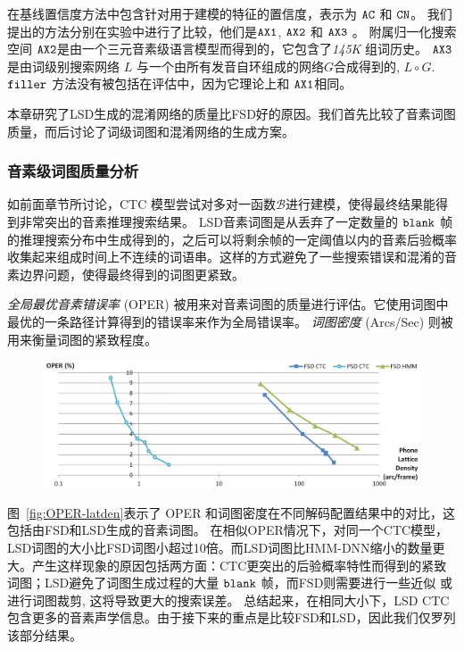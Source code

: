  在基线置信度方法中包含针对用于建模的特征的置信度，表示为 $\tt AC $ 和 $ \tt CN $。 我们提出的方法分别在实验中进行了比较，他们是$\tt AX1 $, $\tt AX2 $ 和 $\tt AX3 $ 。 
 附属归一化搜索空间 $\tt AX2 $是由一个三元音素级语言模型而得到的，它包含了{\em 145K} 组词历史。 $\tt AX3 $ 是由词级别搜索网络 $L$ 与一个由所有发音自环组成的网络$G$合成得到的,  $L \circ G$. $\tt filler$ 方法没有被包括在评估中，因为它理论上和 $\tt AX1$相同。


本章研究了LSD生成的混淆网络的质量比FSD好的原因。我们首先比较了音素词图质量，而后讨论了词级词图和混淆网络的生成方案。


\subsubsection{音素级词图质量分析}
\label{sec:exp-lsd-lat-quality}

如前面章节所讨论，CTC 模型尝试对多对一函数$\mathcal{B}$进行建模，使得最终结果能得到非常突出的音素推理搜索结果。
LSD音素词图是从丢弃了一定数量的 $\tt blank$ 帧的推理搜索分布中生成得到的，之后可以将剩余帧的一定阈值以内的音素后验概率收集起来组成时间上不连续的词语串。这样的方式避免了一些搜索错误和混淆的音素边界问题，使得最终得到的词图更紧致。

{\em 全局最优音素错误率} (OPER) 被用来对音素词图的质量进行评估。它使用词图中最优的一条路径计算得到的错误率来作为全局错误率\cite{hoffmeister2006frame}。 {\em 词图密度} (Arcs/Sec) 则被用来衡量词图的紧致程度\cite{woodland1994large}。


\begin{figure}[!htp]
  \centering
    \captionstyle{\centering}
    \includegraphics[width=\textwidth]{figure/OPER-latden.png}
\end{figure}


图~\ref{fig:OPER-latden}表示了 OPER 和词图密度在不同解码配置结果中的对比，这包括由FSD和LSD生成的音素词图。
在相似OPER情况下，对同一个CTC模型，LSD词图的大小比FSD词图小超过10倍。而LSD词图比HMM-DNN缩小的数量更大。产生这样现象的原因包括两方面：CTC更突出的后验概率特性而得到的紧致词图；LSD避免了词图生成过程的大量 $\tt blank$ 帧，而FSD则需要进行一些近似 \cite{ljolje1999efficient} 或进行词图裁剪\cite{povey2012generating}, 这将导致更大的搜索误差。
总结起来，在相同大小下，LSD CTC包含更多的音素声学信息。由于接下来的重点是比较FSD和LSD，因此我们仅罗列该部分结果。



